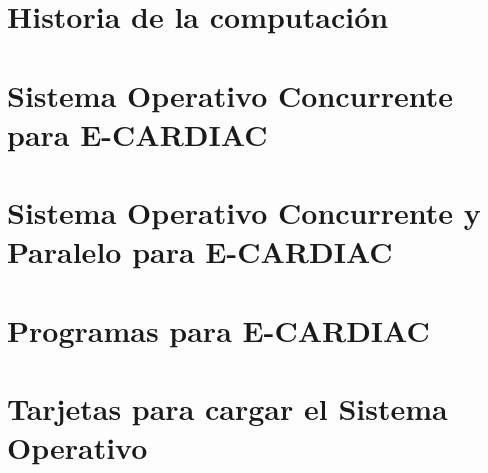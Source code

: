 \documentclass[letterpaper,12pt,oneside]{book}
\begin{document}


\newpage
\appendix
\chapter{Historia de la computación}


\chapter{Sistema Operativo Concurrente para E-CARDIAC}



\chapter{Sistema Operativo Concurrente y Paralelo para E-CARDIAC}



\chapter{Programas para E-CARDIAC}


\chapter{Tarjetas para cargar el Sistema Operativo}

\end{document}
